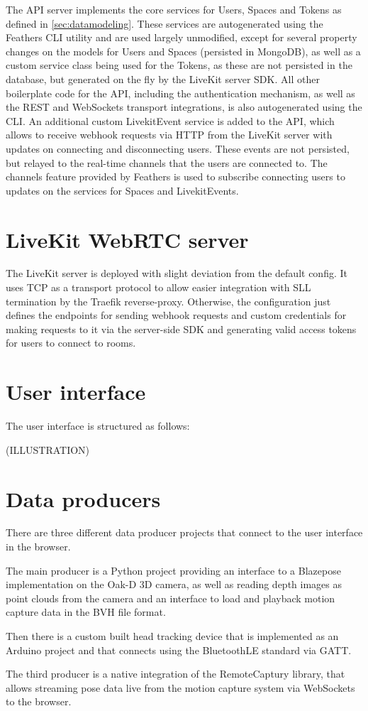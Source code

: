 The \ac{API} server implements the core services for Users, Spaces and Tokens as defined in \autoref{sec:datamodeling}. These services are autogenerated using the Feathers \ac{CLI} utility and are used largely unmodified, except for several property changes on the models for Users and Spaces (persisted in MongoDB), as well as a custom service class being used for the Tokens, as these are not persisted in the database, but generated on the fly by the LiveKit server \ac{SDK}. All other boilerplate code for the \ac{API}, including the authentication mechanism, as well as the REST and WebSockets transport integrations, is also autogenerated using the \ac{CLI}. An additional custom LivekitEvent service is added to the API, which allows to receive webhook requests via HTTP from the LiveKit server with updates on connecting and disconnecting users. These events are not persisted, but relayed to the real-time channels that the users are connected to. The channels feature provided by Feathers is used to subscribe connecting users to updates on the services for Spaces and LivekitEvents.

\section{LiveKit WebRTC server}

The LiveKit server is deployed with slight deviation from the default config. It uses TCP as a transport protocol to allow easier integration with SLL termination by the Traefik reverse-proxy. Otherwise, the configuration just defines the endpoints for sending webhook requests and custom credentials for making requests to it via the server-side \ac{SDK} and generating valid access tokens for users to connect to rooms.

\section{User interface}

The user interface is structured as follows:

(ILLUSTRATION)

\section{Data producers}

There are three different data producer projects that connect to the user interface in the browser.

The main producer is a Python project providing an interface to a Blazepose implementation on the Oak-D \ac{3D} camera, as well as reading depth images as point clouds from the camera and an interface to load and playback motion capture data in the \ac{BVH} file format.

Then there is a custom built head tracking device that is implemented as an Arduino project and that connects using the BluetoothLE standard via \ac{GATT}.

The third producer is a native integration of the RemoteCaptury library, that allows streaming pose data live from the motion capture system via WebSockets to the browser.

